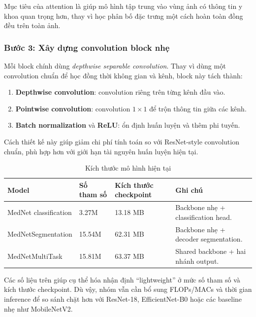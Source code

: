 \documentclass[12pt,a4paper]{article}
\begin{document}
Mục tiêu của attention là giúp mô hình tập trung vào vùng ảnh có thông tin y khoa quan trọng hơn, thay vì học phân bố đặc trưng một cách hoàn toàn đồng đều trên toàn ảnh.

\subsubsection*{Bước 3: Xây dựng convolution block nhẹ}

Mỗi block chính dùng \textit{depthwise separable convolution}. Thay vì dùng một convolution chuẩn để học đồng thời không gian và kênh, block này tách thành:

\begin{enumerate}
    \item \textbf{Depthwise convolution}: convolution riêng trên từng kênh đầu vào.
    \item \textbf{Pointwise convolution}: convolution \(1 \times 1\) để trộn thông tin giữa các kênh.
    \item \textbf{Batch normalization} và \textbf{ReLU}: ổn định huấn luyện và thêm phi tuyến.
\end{enumerate}

Cách thiết kế này giúp giảm chi phí tính toán so với ResNet-style convolution chuẩn, phù hợp hơn với giới hạn tài nguyên huấn luyện hiện tại.

\begin{table}[H]
\centering
\caption{Kích thước mô hình hiện tại}
\renewcommand{\arraystretch}{1.25}
\begin{tabular}{p{4.2cm} p{3.2cm} p{3.2cm} p{4.2cm}}
\toprule
\textbf{Model} & \textbf{Số tham số} & \textbf{Kích thước checkpoint} & \textbf{Ghi chú} \\
\midrule
MedNet classification & 3.27M & 13.18 MB & Backbone nhẹ + classification head. \\
MedNetSegmentation & 15.54M & 62.31 MB & Backbone nhẹ + decoder segmentation. \\
MedNetMultiTask & 15.81M & 63.37 MB & Shared backbone + hai nhánh output. \\
\bottomrule
\end{tabular}
\end{table}

Các số liệu trên giúp cụ thể hóa nhận định ``lightweight'' ở mức số tham số và kích thước checkpoint. Dù vậy, nhóm vẫn cần bổ sung FLOPs/MACs và thời gian inference để so sánh chặt hơn với ResNet-18, EfficientNet-B0 hoặc các baseline nhẹ như MobileNetV2.
\end{document}
